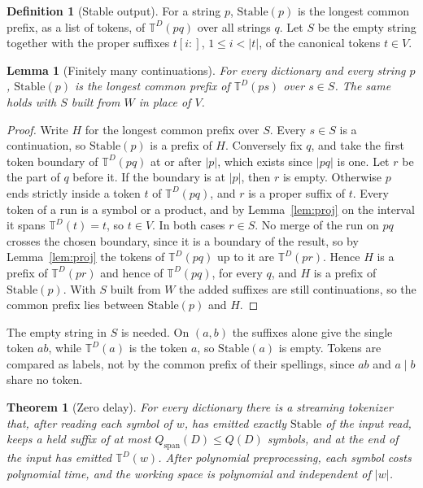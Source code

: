 \documentclass[11pt,a4paper]{article}
\theoremstyle{definition}
\newtheorem{definition}{Definition}
\theoremstyle{plain}
\newtheorem{lemma}{Lemma}
\newtheorem{theorem}{Theorem}
\newcommand{\T}{\mathbb{T}}
\newcommand{\Stable}{\mathrm{Stable}}
\begin{document}
\begin{definition}[Stable output]\label{def:stable}
For a string \(p\), \(\Stable(p)\) is the longest common prefix, as a list of tokens, of \(\T^D(pq)\) over all strings
\(q\). Let \(S\) be the empty string together with the proper suffixes \(t[i{:}]\), \(1 \le i < |t|\), of the canonical
tokens \(t \in V\).
\end{definition}

\begin{lemma}[Finitely many continuations]\label{lem:finitecont}
For every dictionary and every string \(p\), \(\Stable(p)\) is the longest common prefix of \(\T^D(ps)\) over
\(s \in S\). The same holds with \(S\) built from \(W\) in place of \(V\).
\end{lemma}

\begin{proof}
Write \(H\) for the longest common prefix over \(S\). Every \(s \in S\) is a continuation, so \(\Stable(p)\) is a prefix
of \(H\). Conversely fix \(q\), and take the first token boundary of \(\T^D(pq)\) at or after \(|p|\), which exists
since \(|pq|\) is one. Let \(r\) be the part of \(q\) before it. If the boundary is at \(|p|\), then \(r\) is empty.
Otherwise \(p\) ends strictly inside a token \(t\) of \(\T^D(pq)\), and \(r\) is a proper suffix of \(t\). Every token
of a run is a symbol or a product, and by Lemma~\ref{lem:proj} on the interval it spans \(\T^D(t) = t\), so \(t \in V\).
In both cases \(r \in S\). No merge of the run on \(pq\) crosses the chosen boundary, since it is a boundary of the
result, so by Lemma~\ref{lem:proj} the tokens of \(\T^D(pq)\) up to it are \(\T^D(pr)\). Hence \(H\) is a prefix of
\(\T^D(pr)\) and hence of \(\T^D(pq)\), for every \(q\), and \(H\) is a prefix of \(\Stable(p)\). With \(S\) built from
\(W\) the added suffixes are still continuations, so the common prefix lies between \(\Stable(p)\) and \(H\).
\end{proof}

The empty string in \(S\) is needed. On \((a, b)\) the suffixes alone give the single token \(ab\), while \(\T^D(a)\) is
the token \(a\), so \(\Stable(a)\) is empty. Tokens are compared as labels, not by the common prefix of their spellings,
since \(ab\) and \(a \mid b\) share no token.

\begin{theorem}[Zero delay]\label{thm:zerodelay}
For every dictionary there is a streaming tokenizer that, after reading each symbol of \(w\), has emitted exactly
\(\Stable\) of the input read, keeps a held suffix of at most \(Q_{\mathrm{span}}(D) \le Q(D)\) symbols, and at the end
of the input has emitted \(\T^D(w)\). After polynomial preprocessing, each symbol costs polynomial time, and the working
space is polynomial and independent of \(|w|\).
\end{theorem}
\end{document}
